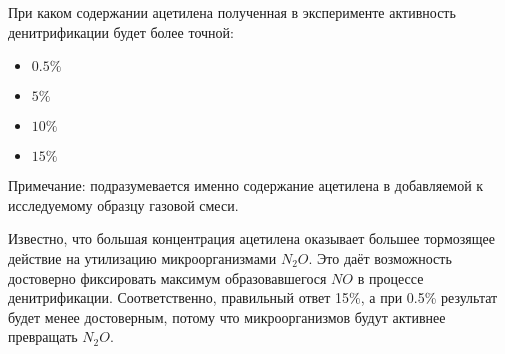 
При каком содержании ацетилена полученная в эксперименте активность денитрификации будет более точной:

\begin{itemize}
    \item $0.5\%$
    \item $5\%$
    \item $10\%$
    \item $15\%$
\end{itemize}

Примечание: подразумевается именно содержание ацетилена в добавляемой к исследуемому образцу газовой смеси.

\explanationSection

Известно, что большая концентрация ацетилена оказывает большее тормозящее действие на утилизацию микроорганизмами $N_2O$. Это даёт возможность достоверно фиксировать максимум образовавшегося $NO$ в процессе денитрификации. Соответственно, правильный ответ 15\%, а при 0.5\% результат будет менее достоверным, потому что микроорганизмов будут активнее превращать $N_2O$.

